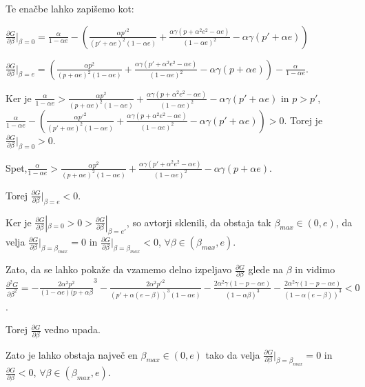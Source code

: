 \documentclass{acm_proc_article-sp}
\begin{document}
Te enačbe lahko zapišemo kot:\newline

$\frac{\partial G}{\partial \beta}|_{\beta=0} =
\frac{\alpha}{1-\alpha e} - (
\frac{\alpha p'^2}{(p' + \alpha e)^2(1-\alpha e)} + 
\frac{\alpha\gamma(p+\alpha^2e^2-\alpha e)}{(1-\alpha e)^2} -
\alpha\gamma(p' + \alpha e))$\newline


$\frac{\partial G}{\partial \beta}|_{\beta=e} = (
\frac{\alpha p^2}{(p+\alpha e)^2(1-\alpha e)} +
\frac{\alpha\gamma(p'+\alpha^2e^2-\alpha e)}{(1 - \alpha e)^2} - \alpha\gamma(p +\alpha e)) - \frac{\alpha}{1 - \alpha e}.
$\newline

Ker je \textit{$\frac{\alpha}{1-\alpha e} > \frac{\alpha p^2}{(p+\alpha e)^2(1-\alpha e)} + \frac{\alpha\gamma(p+\alpha^2e^2-\alpha e)}{(1-\alpha e)^2} - \alpha\gamma(p'+\alpha e)$} in \textit{$p > p'$}, \textit{$\frac{\alpha}{1-\alpha e} - (\frac{\alpha p'^2}{(p'+\alpha e)^2(1-\alpha e)}+ \frac{\alpha\gamma(p+\alpha^2e^2-\alpha e)}{(1-\alpha e)^2} - \alpha\gamma(p' +\alpha e)) > 0$}. Torej je \textit{$\frac{\partial G}{\partial \beta}|_{\beta=0} > 0$}.

Spet,\textit{$\frac{\alpha}{1-\alpha e} >
\frac{\alpha p^2}{(p+\alpha e)^2(1-\alpha e)} +
\frac{\alpha\gamma(p'+\alpha^2e^2 -\alpha e)}{(1-\alpha e)^2} -
\alpha\gamma(p+\alpha e)$}.

Torej \textit{$\frac{\partial G}{\partial \beta}|_{\beta=e}<0$}.


Ker je \textit{$\frac{\partial G}{\partial \beta}|_{\beta=0}> 0 > \frac{\partial G}{\partial \beta}|_{\beta=e'}$}, so avtorji sklenili, da obstaja tak \textit{$\beta_{max} \in (0, e)$}, da velja \textit{$\frac{\partial G}{\partial \beta}|_{\beta = \beta_{max}} = 0$}  in \textit{$\frac{\partial G}{\partial \beta}|_{\beta = \beta_{max}} < 0$},  \textit{$\forall \beta \in (\beta_{max}, e)$}.

Zato, da se lahko pokaže da vzamemo delno izpeljavo \textit{$\frac{\partial G}{\partial \beta}$} glede na \textit{$\beta$} in vidimo \textit{$\frac{\partial^2G}{\partial \beta^2} = - \frac{2\alpha^2p^2}{(1-\alpha e)(p+\alpha\beta}^3 - \frac{2\alpha^2p'^2}{(p'+\alpha(e-\beta))^3(1-\alpha e)} - \frac{2\alpha^2\gamma(1-p-\alpha e)}{(1-\alpha\beta)^3}-\frac{2\alpha^2\gamma(1-p-\alpha e)}{(1-\alpha(e-\beta))^3} < 0$}.

Torej \textit{$\frac{\partial G}{\partial \beta}$} vedno upada.


Zato je lahko obstaja največ en \textit{$\beta_{max} \in (0,e)$} tako da velja \textit{$\frac{\partial G}{\partial \beta}|_{\beta=\beta_{max}} = 0$} in \textit{$\frac{\partial G}{\partial \beta} < 0$}, \textit{$\forall \beta \in (\beta_{max}, e)$}.
\end{document}
